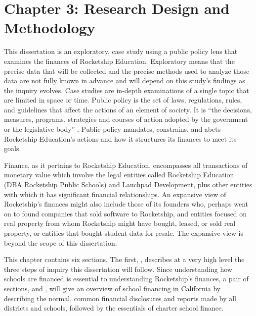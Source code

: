 
\chapter{Chapter 3: Research Design and Methodology}\label{ch:methods}\indent%
This dissertation is an exploratory, case study using a public policy lens that examines the finances of Rocketship Education. Exploratory means that the precise data that will be collected and the precise methods used to analyze those data are not fully known in advance and will depend on this study's findings as the inquiry evolves. Case studies are in-depth examinations of a single topic that are limited in space or time. Public policy is the set of laws, regulations, rules, and guidelines that affect the actions of an element of society. It is ``the decisions, measures, programs, strategies and courses of action adopted by the government or the legislative body'' \parencite[3]{Knill.Tosun2020}. Public policy mandates, constrains, and abets Rocketship Education's actions and how it structures its finances to meet its goals.

Finance, as it pertains to Rocketship Education, encompasses all transactions of monetary value which involve the legal entities called Rocketship Education (DBA Rocketship Public Schools) and Lauchpad Development, plus other entities with which it has significant financial relationships. An expansive view of Rocketship's finances might also include those of its founders who, perhaps went on to found companies that sold software to Rocketship, and entities focused on real property from whom Rocketship might have bought, leased, or sold real property, or entities that bought student data for resale. The expansive view is beyond the scope of this dissertation.

This chapter contains six sections. The first, ,
describes at a very high level the three steps of inquiry this dissertation will follow. Since understanding how schools are financed is essential to understanding Rocketship's finances, a pair of sections,  and , will give an overview of school financing in California by describing the normal, common financial disclosures and reports made by all districts and schools, followed by the essentials of charter school finance. 

